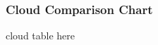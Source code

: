 \renewcommand{\imgpath}{legacy/old-cloud/img}

\subsubsection{Cloud Comparison Chart}
cloud table here
